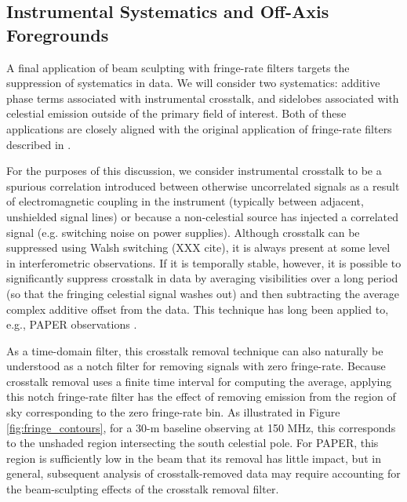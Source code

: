 \documentclass[twocolumn,apj,numberedappendix]{emulateapj}
\begin{document}
\subsection{Instrumental Systematics and Off-Axis Foregrounds}
\label{sec:foregrounds}


A final application of beam sculpting with fringe-rate filters targets the suppression of systematics in data.
We will consider two systematics: additive phase terms associated with instrumental crosstalk, and sidelobes
associated with celestial emission outside of the primary field of interest.  Both of these applications are 
closely aligned with the original application of fringe-rate filters described in \citet{parsons_backer2009}.

For the purposes of this discussion, we consider instrumental crosstalk to be a spurious 
correlation introduced between otherwise uncorrelated signals
as a result of electromagnetic coupling in the instrument (typically between adjacent, unshielded signal lines)
or because a non-celestial source has injected a correlated signal (e.g. switching noise on power supplies).
Although crosstalk can be suppressed using Walsh switching (XXX cite), it is always present at some level
in interferometric observations.  If it is temporally stable, however, it is possible to significantly
suppress crosstalk in data by averaging visibilities over a long period (so that the fringing celestial
signal washes out) and then subtracting the average complex additive offset from the data.  This 
technique has
long been applied to, e.g., PAPER observations \citep{parsons_et_al2010,jacobs_et_al,pober_et_al,parsons_et_al2014}.

As a time-domain filter, this crosstalk removal technique can also naturally be understood as a notch filter
for removing signals with zero fringe-rate.  Because crosstalk removal uses a finite time interval for computing
the average, applying this notch fringe-rate filter has the effect of removing emission from the region of
sky corresponding to the zero fringe-rate bin.  As illustrated in Figure \ref{fig:fringe_contours}, for
a 30-m baseline observing at 150 MHz, this corresponds to the unshaded region intersecting the south celestial pole.
For PAPER, this region is sufficiently low in the beam that its removal has little impact, but in general, 
subsequent analysis of crosstalk-removed data may require accounting for the beam-sculpting effects of
the crosstalk removal filter.
\end{document}
